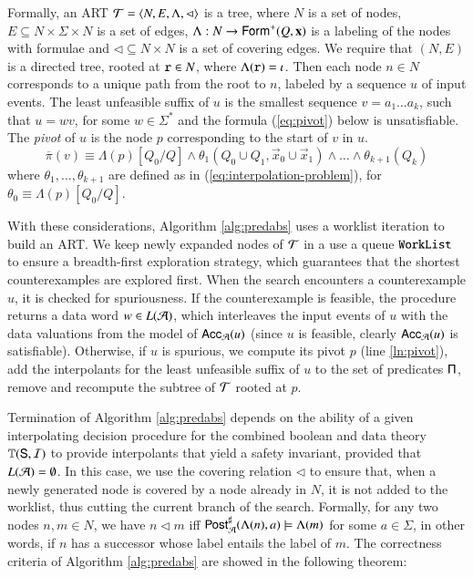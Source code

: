 \documentclass[10pt,conference,letterpaper,twocolumn]{IEEEtran}
\begin{document}
Formally, an ART $\mathcal{T} = \left\langle N,E,\Lambda,\lhd \right\rangle$ is a tree, where
$N$ is a set of nodes, $E \subseteq N \times \Sigma \times N$ is a set
of edges, $\Lambda : N \rightarrow \mathsf{Form}^+(Q,\mathbf x)$ is a labeling
of the nodes with formulae and $\lhd \subseteq N \times N$ is a set of
covering edges. We require that $(N,E)$ is a directed tree, rooted at
$\mathtt{r} \in N$, where $\Lambda(\mathtt{r}) = \iota$. Then each node
$n \in N$ corresponds to a unique path from the root to $n$, labeled
by a sequence $u$ of input events. The least unfeasible suffix of $u$
is the smallest sequence $v = a_1 \ldots a_k$, such that $u = wv$, for
some $w \in \Sigma^*$ and the formula (\ref{eq:pivot}) below is
unsatisfiable. The \emph{pivot} of $u$ is the node $p$ corresponding
to the start of $v$ in $u$.
\begin{equation}\label{eq:pivot}
  \overline{\pi}(v) \equiv \Lambda(p)[Q_0/Q] \wedge
  \theta_1(Q_0 \cup Q_1,\vec{x}_0 \cup \vec{x}_1) \wedge \ldots \wedge
  \theta_{k+1}(Q_k)
\end{equation}
where $\theta_1,\ldots,\theta_{k+1}$ are defined as in
(\ref{eq:interpolation-problem}), for $\theta_0 \equiv
\Lambda(p)[Q_0/Q]$. 

With these considerations, Algorithm \ref{alg:predabs} uses a worklist
iteration to build an ART. We keep newly expanded nodes of $\mathcal{T}$ in a
use a queue $\mathtt{WorkList}$ to ensure a breadth-first exploration
strategy, which guarantees that the shortest counterexamples are
explored first. When the search encounters a counterexample $u$, it is
checked for spuriousness. If the counterexample is feasible, the procedure
returns a data word $w \in L(\mathcal{A})$, which interleaves the input events
of $u$ with the data valuations from the model of $\mathsf{Acc}_{\mathcal{A}}(u)$
(since $u$ is feasible, clearly $\mathsf{Acc}_{\mathcal{A}}(u)$ is
satisfiable). Otherwise, if $u$ is spurious, we compute its pivot $p$
(line \ref{ln:pivot}), add the interpolants for the least unfeasible
suffix of $u$ to the set of predicates $\mathsf{\Pi}$, remove and recompute
the subtree of $\mathcal{T}$ rooted at $p$.

Termination of Algorithm \ref{alg:predabs} depends on the ability of a
given interpolating decision procedure for the combined boolean and
data theory $\mathbb{T}(\mathsf{S},\mathcal{I})$ to provide interpolants that yield a
safety invariant, provided that $L(\mathcal{A}) = \emptyset$. In this case, we
use the covering relation $\lhd$ to ensure that, when a newly
generated node is covered by a node already in $N$, it is not added to
the worklist, thus cutting the current branch of the search. Formally,
for any two nodes $n,m \in N$, we have $n \lhd m$ iff
${\mathsf{Post}}^\sharp_{\mathcal{A}}(\Lambda(n),a) \models \Lambda(m)$ for some $a \in
\Sigma$, in other words, if $n$ has a successor whose label entails
the label of $m$. The correctness criteria of Algorithm
\ref{alg:predabs} are showed in the following theorem:
\end{document}
